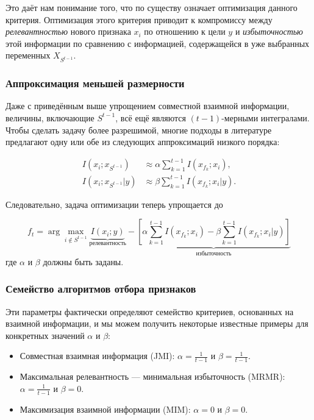 Это даёт нам понимание того, что по существу означает оптимизация данного критерия. Оптимизация этого критерия приводит к компромиссу между \textit{релевантностью} нового признака $x_i$ по отношению к цели $y$ и \textit{избыточностью} этой информации по сравнению с информацией, содержащейся в уже выбранных переменных $X_{S^{t - 1}}$.

\subsubsection{Аппроксимация меньшей размерности}

Даже с приведённым выше упрощением совместной взаимной информации, величины, включающие $S^{t - 1}$, всё ещё являются $(t - 1)$-мерными интегралами. Чтобы сделать задачу более разрешимой, многие подходы в литературе предлагают одну или обе из следующих аппроксимаций низкого порядка:

\begin{align}
I(x_i ; x_{S^{t - 1}}) &\approx \alpha \sum_{k = 1}^{t-1} I(x_{f_k}; x_i), \\
I(x_i ; x_{S^{t - 1}} | y) &\approx \beta \sum_{k = 1}^{t - 1} I(x_{f_k}; x_i | y).
\end{align}

Следовательно, задача оптимизации теперь упрощается до

$$
f_t = \arg\max_{i \notin S^{t - 1}} \underbrace{I(x_i; y)}_{\text{релевантность}} - \underbrace{\left[ \alpha \sum_{k = 1}^{t-1} I(x_{f_k}; x_i) - \beta \sum_{k = 1}^{t - 1} I(x_{f_k}; x_i | y) \right]}_{\text{избыточность}}
$$
где $\alpha$ и $\beta$ должны быть заданы.

\subsubsection{Семейство алгоритмов отбора признаков}

Эти параметры фактически определяют семейство критериев, основанных на взаимной информации, и мы можем получить некоторые известные примеры для конкретных значений $\alpha$ и $\beta$:

\begin{itemize}
	\item Совместная взаимная информация (JMI): $\alpha = \frac{1}{t - 1}$ и $\beta = \frac{1}{t - 1}$.
	\item Максимальная релевантность — минимальная избыточность (MRMR): $\alpha = \frac{1}{t - 1}$ и $\beta = 0$.
	\item Максимизация взаимной информации (MIM): $\alpha = 0$ и $\beta = 0$.
\end{itemize}


